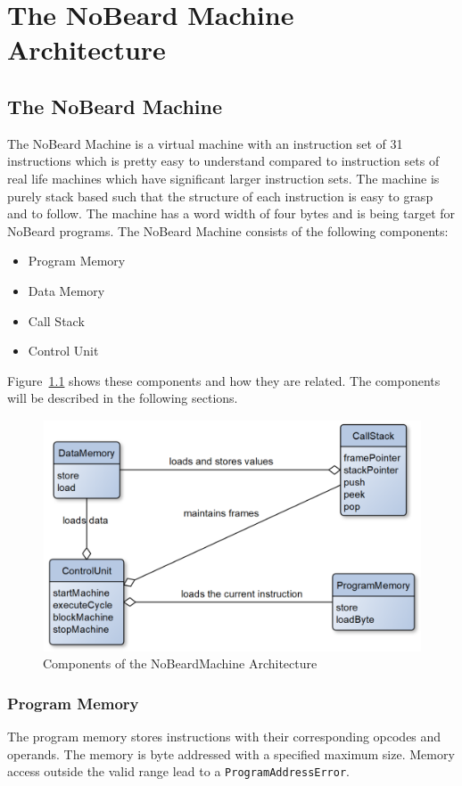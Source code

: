 \chapter{The NoBeard Machine Architecture}
\lstset{language=NoBeardAsm}
\section{The NoBeard Machine}
The NoBeard Machine is a virtual machine with an instruction set of 31 instructions which is pretty easy to understand compared to instruction sets of real life machines which have significant larger instruction sets. The machine is purely stack based such that the structure of each instruction is easy to grasp and to follow. The machine has a word width of four bytes and is being target for NoBeard programs. The NoBeard Machine consists of the following components:
\begin{itemize}
	\item Program Memory
	\item Data Memory
	\item Call Stack
	\item Control Unit
\end{itemize}
Figure~\ref{fig:componentsOfNbM} shows these components and how they are related. The components will be described in the following sections.

\begin{figure}
	\centering
	\includegraphics[scale=.62]{images/componentsOfNbM.png}
	\caption{Components of the NoBeardMachine Architecture}
	\label{fig:componentsOfNbM}
\end{figure}
\subsection{Program Memory}
The program memory stores instructions with their corresponding opcodes and operands. The memory is byte addressed with a specified  maximum size. Memory access outside the valid range lead to a \lstinline$ProgramAddressError$.

